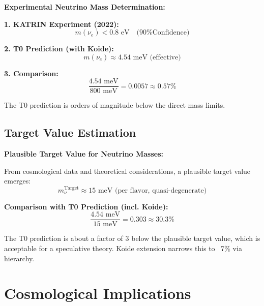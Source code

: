 	\begin{experimental}
		\textbf{Experimental Neutrino Mass Determination:}
		
		\textbf{1. KATRIN Experiment (2022):}
		\begin{equation}
			m(\nu_e) < 0.8 \text{ eV} \quad \text{(90\% Confidence)}
		\end{equation}
		
		\textbf{2. T0 Prediction (with Koide):}
		\begin{equation}
			m(\nu_e) \approx 4.54 \text{ meV (effective)}
		\end{equation}
		
		\textbf{3. Comparison:}
		\begin{equation}
			\frac{4.54 \text{ meV}}{800 \text{ meV}} = 0.0057 \approx 0.57\%
		\end{equation}
		
		The T0 prediction is orders of magnitude below the direct mass limits.
	\end{experimental}
	
	\subsection{Target Value Estimation}
	
	\begin{keyresult}
		\textbf{Plausible Target Value for Neutrino Masses:}
		
		From cosmological data and theoretical considerations, a plausible target value emerges:
		\begin{equation}
			m_\nu^{\text{Target}} \approx 15 \text{ meV (per flavor, quasi-degenerate)}
		\end{equation}
		
		\textbf{Comparison with T0 Prediction (incl. Koide):}
		\begin{equation}
			\frac{4.54 \text{ meV}}{15 \text{ meV}} = 0.303 \approx 30.3\%
		\end{equation}
		
		The T0 prediction is about a factor of 3 below the plausible target value, which is acceptable for a speculative theory. Koide extension narrows this to ~7\% via hierarchy.
	\end{keyresult}
	
	\section{Cosmological Implications}
	
